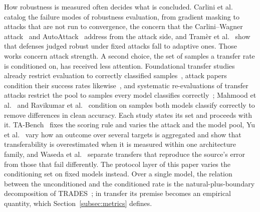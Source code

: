 How robustness is measured often decides what is concluded. Carlini et al.~\cite{carlini2019evaluating} catalog the failure modes of robustness evaluation, from gradient masking to attacks that are not run to convergence, the concern that the Carlini--Wagner attack~\cite{carlini2017towards} and AutoAttack~\cite{croce2020reliable} address from the attack side, and Tram\`er et al.~\cite{tramer2020adaptive} show that defenses judged robust under fixed attacks fall to adaptive ones. Those works concern attack strength. A second choice, the set of samples a transfer rate is conditioned on, has received less attention. Foundational transfer studies already restrict evaluation to correctly classified samples~\cite{liu2017delving}, attack papers condition their success rates likewise~\cite{dong2018boosting}, and systematic re-evaluations of transfer attacks restrict the pool to samples every model classifies correctly~\cite{zhao2025revisiting}; Mahmood et al.~\cite{mahmood2021robustness} and Ravikumar et al.~\cite{ravikumar2023trend} condition on samples both models classify correctly to remove differences in clean accuracy. Each study states its set and proceeds with it. TA-Bench~\cite{li2023tabench} fixes the scoring rule and varies the attack and the model pool, Yu et al.~\cite{yu2025reliable} vary how an outcome over several targets is aggregated and show that transferability is overestimated when it is measured within one architecture family, and Waseda et al.~\cite{waseda2023closer} separate transfers that reproduce the source's error from those that fail differently. The protocol layer of this paper varies the conditioning set on fixed models instead. Over a single model, the relation between the unconditioned and the conditioned rate is the natural-plus-boundary decomposition of TRADES~\cite{zhang2019theoretically}; in transfer its premise becomes an empirical quantity, which Section~\ref{subsec:metrics} defines.
